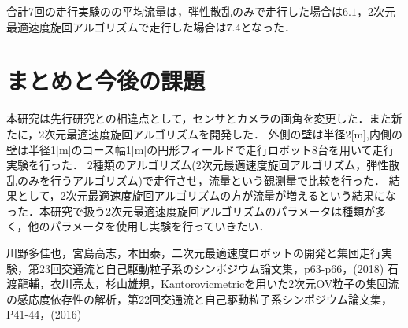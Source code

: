 \documentclass[twocolumn,dvipdfmx]{jarticle}
\begin{document}

合計7回の走行実験のの平均流量は，弾性散乱のみで走行した場合は$6.1$，2次元最適速度旋回アルゴリズムで走行した場合は$7.4$となった．

\vspace{-3mm}
\section{まとめと今後の課題}
本研究は先行研究との相違点として，センサとカメラの画角を変更した．また新たに，2次元最適速度旋回アルゴリズムを開発した．
外側の壁は半径2[m],内側の壁は半径1[m]のコース幅1[m]の円形フィールドで走行ロボット8台を用いて走行実験を行った．
2種類のアルゴリズム(2次元最適速度旋回アルゴリズム，弾性散乱のみを行うアルゴリズム)で走行させ，流量という観測量で比較を行った．
結果として，2次元最適速度旋回アルゴリズムの方が流量が増えるという結果になった．本研究で扱う2次元最適速度旋回アルゴリズムのパラメータは種類が多く，他のパラメータを使用し実験を行っていきたい．
\vspace{-3mm}
\begin{thebibliography}{99}
 川野多佳也，宮島高志，本田泰，二次元最適速度ロボットの開発と集団走行実験，第23回交通流と自己駆動粒子系のシンポジウム論文集，p63-p66，(2018)
 石渡龍輔，衣川亮太，杉山雄規，Kantorovicmetricを用いた2次元OV粒子の集団流の感応度依存性の解析，第22回交通流と自己駆動粒子系シンポジウム論文集，P41-44，(2016)
\end{thebibliography}
\end{document}
